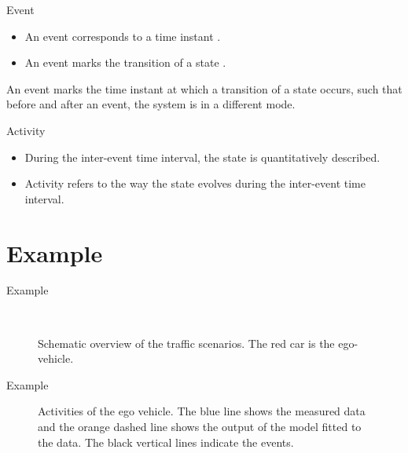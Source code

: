 \documentclass[aspectratio=\AspectR,10pt,compress,t]{beamer} %
\newlength\figurewidth
\newlength\figureheight
\begin{document}
\begin{frame}{Event}
	\begin{itemize}
		\item An event corresponds to a time instant \cite{breu1997towards, kim1993supervenience, sartori1996understanding, branicky1998hybridcontrol, boel1999hybridcontrol, heemels2012eventcontrol}.
		\item An event marks the transition of a state \cite{deGelder2017assessment}.
	\end{itemize}
	\begin{definition}[Event]
		An event marks the time instant at which a transition of a state occurs, such that before and after an event, the system is in a different mode.
	\end{definition}
\end{frame}

\begin{frame}{Activity}
	\begin{itemize}
		\item During the inter-event time interval, the state is quantitatively described.
		\item Activity refers to the way the state evolves during the inter-event time interval.
	\end{itemize}
\end{frame}

\section{Example}
\begin{frame}{Example}
	\vspace{-1em}
	\begin{figure}
		\centering
		\setlength\figureheight{100pt}
		\setlength\figurewidth{247pt}
		\\
		\setlength\figureheight{95pt}
		\caption{Schematic overview of the traffic scenarios. The red car is the ego-vehicle.}
	\end{figure}
\end{frame}

\begin{frame}{Example}
	\vspace{-1em}
	\begin{figure}
		\centering
		\setlength\figureheight{140pt}
		\setlength\figurewidth{248pt}
		
		\caption{Activities of the ego vehicle. The blue line shows the measured data and the orange dashed line shows the output of the model fitted to the data. The black vertical lines indicate the events.}
	\end{figure}
\end{frame}
\end{document}
